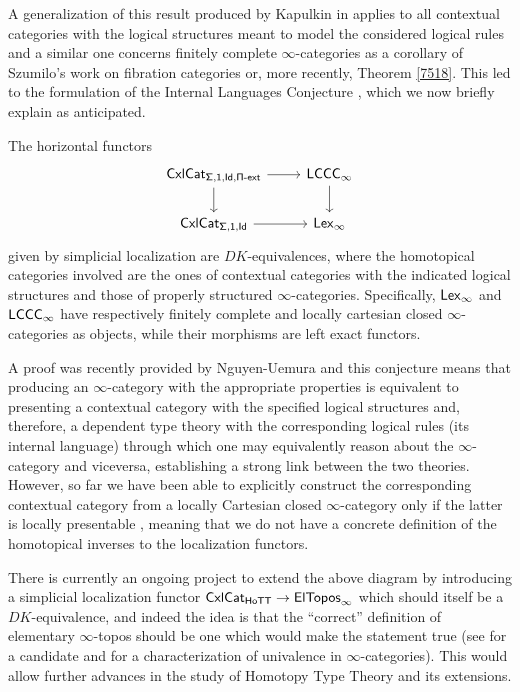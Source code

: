 \noindent
A generalization of this result produced by Kapulkin in \cite{Kap17}
applies to all contextual categories with the
logical structures meant to model the considered logical rules and a similar one
concerns finitely complete $\infty$-categories as a corollary of Szumilo's
work on fibration categories \cite{Szu14} or, more recently, Theorem \ref{7518}.
This led to the formulation of the Internal Languages Conjecture \cite[Conj.\
3.7]{KL16}, which we now briefly explain as anticipated.

\begin{intlang}\label{intlang}
  The horizontal functors
  \[\begin{tikzcd}
    {\Cxl_{\Sigmas,\mathsf{1},\Ids,\Piext}} & \LCCCi \\
    {\Cxl_{\Sigmas,\mathsf{1},\Ids}} & \Lexi
    \arrow[from=2-1, to=2-2]
    \arrow[from=1-2, to=2-2]
    \arrow[from=1-1, to=2-1]
    \arrow[from=1-1, to=1-2]
  \end{tikzcd}\]
  given by simplicial localization are $DK$-equivalences, where the homotopical
  categories involved are the ones of contextual categories with the indicated
  logical structures and those of properly structured $\infty$-categories.
  Specifically, $\operatorname{\mathsf{Lex}_\infty}$ and $\operatorname{\mathsf{LCCC}_\infty}$ have respectively finitely complete and
  locally cartesian closed $\infty$-categories as objects, while their morphisms
  are left exact functors.
\end{intlang}

\noindent
A proof was recently provided by Nguyen-Uemura \cite{NU22} and this
conjecture means that producing an $\infty$-category with the appropriate
properties is equivalent to presenting a contextual category with the specified
logical structures and, therefore, a dependent type theory with the
corresponding logical rules (its internal language) through which
one may equivalently reason about the $\infty$-category and viceversa,
establishing a strong link between the two theories.
However, so far we have been able to explicitly construct the corresponding
contextual category from a locally Cartesian closed $\infty$-category only if
the latter is locally presentable \cite{Shu14}, meaning that we do not have a
concrete definition of the homotopical inverses to the localization functors.

\noindent
There is currently an ongoing project to 
extend the above diagram by introducing a simplicial localization
functor $\operatorname{\mathsf{CxlCat}}_{\mathsf{HoTT}}\rightarrow\operatorname{\mathsf{ElTopos}_\infty}$ which should itself be a
$DK$-equivalence, and indeed the idea is that the ``correct'' definition of
elementary $\infty$-topos should be one which would make the statement true (see
\cite{Ras18} for a candidate and \cite{Ras21} for a characterization of
univalence in $\infty$-categories). This would allow further advances in the
study of Homotopy Type Theory and its extensions.

